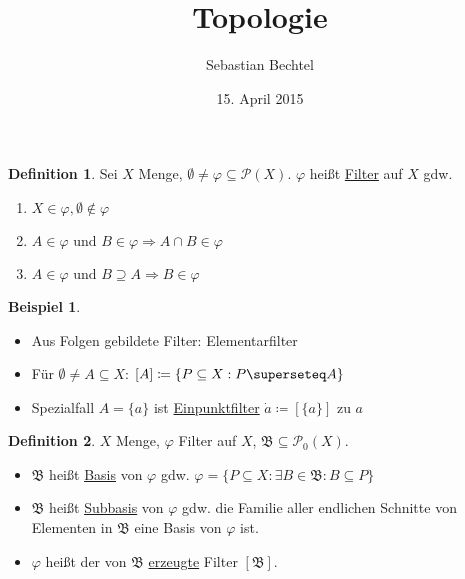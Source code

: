 \documentclass[12pt]{scrartcl}%
\theoremstyle{definition}
\newtheorem*{defn}{Definition}
\newtheorem{ex}{Beispiel}
\theoremstyle{remark}
\newcommand{\powerset}{\mathcal{P}}
\newcommand{\implies}{\Rightarrow}
\begin{document}
\author{Sebastian Bechtel}
\title{Topologie}
\date{15. April 2015}

\maketitle %

\begin{defn}
    Sei $X$ Menge, $\emptyset\neq \varphi\subseteq \powerset(X)$. $\varphi$ heißt \underline{Filter} auf $X$ gdw.

    \begin{enumerate}[label=(\arabic*)]
        \item $X\in \varphi, \emptyset\not\in\varphi$
        \item $A\in\varphi \text{ und } B\in\varphi \implies A\cap B\in\varphi$
        \item $A\in\varphi \text{ und } B\supseteq A \implies B\in\varphi$
    \end{enumerate}
\end{defn}

\begin{ex}
    \begin{itemize}
        \item Aus Folgen gebildete Filter: Elementarfilter
        \item Für $\emptyset \neq A\subseteq X$: $[A]\coloneqq \{P\subseteq X: P\superseteq A\}$
        \item Spezialfall $A=\{a\}$ ist \underline{Einpunktfilter} $\dot a\coloneqq [\{a\}]$ zu $a$
    \end{itemize}
\end{ex}

\begin{defn}
    $X$ Menge, $\varphi$ Filter auf $X$, $\mathfrak{B}\subseteq \powerset_0(X)$.

    \begin{itemize}
        \item $\mathfrak{B}$ heißt \underline{Basis} von $\varphi$ gdw. $\varphi = \{P\subseteq X: \exists B\in\mathfrak{B}: B\subseteq P\}$
        \item $\mathfrak{B}$ heißt \underline{Subbasis} von $\varphi$ gdw. die Familie aller endlichen Schnitte von Elementen in $\mathfrak{B}$ eine Basis von $\varphi$ ist.
        \item $\varphi$ heißt der von $\mathfrak{B}$ \underline{erzeugte} Filter $[\mathfrak{B}]$.
    \end{itemize}
\end{defn}
\end{document}
